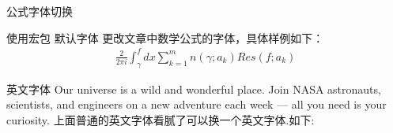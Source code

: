 \documentclass[fontset=windows, 12pt]{article}
\begin{document}
    
    \begin{tformal}[blue]{公式字体切换}

        使用宏包 默认字体 更改文章中数学公式的字体，具体样例如下：
    \begin{align}
        \frac{2}{2\pi i}\int_{\gamma}^{f}{ dx}\sum_{k=1}^{m}{n(\gamma;a_k)Res(f;a_k)}
    \end{align}

    \end{tformal}

    \begin{tformal}[red]{英文字体}
        Our universe is a wild and wonderful place. Join NASA astronauts, 
        scientists, and engineers on a new adventure each week — 
        all you need is your curiosity. 
        上面普通的英文字体看腻了可以换一个英文字体.如下:

    \end{tformal}
\end{document}
